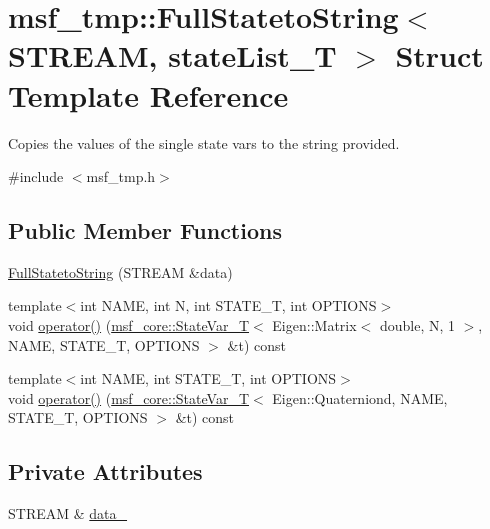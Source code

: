 \hypertarget{structmsf__tmp_1_1FullStatetoString}{\section{msf\-\_\-tmp\-:\-:Full\-Stateto\-String$<$ S\-T\-R\-E\-A\-M, state\-List\-\_\-\-T $>$ Struct Template Reference}
\label{structmsf__tmp_1_1FullStatetoString}
}


Copies the values of the single state vars to the string provided.  




{\ttfamily \#include $<$msf\-\_\-tmp.\-h$>$}

\subsection*{Public Member Functions}
\begin{DoxyCompactItemize}
\item 
\hyperlink{structmsf__tmp_1_1FullStatetoString_a01b581b8a93e7de256d487d609f9f1ca}{Full\-Stateto\-String} (S\-T\-R\-E\-A\-M \&data)
\item 
{\footnotesize template$<$int N\-A\-M\-E, int N, int S\-T\-A\-T\-E\-\_\-\-T, int O\-P\-T\-I\-O\-N\-S$>$ }\\void \hyperlink{structmsf__tmp_1_1FullStatetoString_a8ab4cd670bb8d0a94040ca09bad2a28d}{operator()} (\hyperlink{structmsf__core_1_1StateVar__T}{msf\-\_\-core\-::\-State\-Var\-\_\-\-T}$<$ Eigen\-::\-Matrix$<$ double, N, 1 $>$, N\-A\-M\-E, S\-T\-A\-T\-E\-\_\-\-T, O\-P\-T\-I\-O\-N\-S $>$ \&t) const 
\item 
{\footnotesize template$<$int N\-A\-M\-E, int S\-T\-A\-T\-E\-\_\-\-T, int O\-P\-T\-I\-O\-N\-S$>$ }\\void \hyperlink{structmsf__tmp_1_1FullStatetoString_af63628ec73c77813ebc5abfd30add10e}{operator()} (\hyperlink{structmsf__core_1_1StateVar__T}{msf\-\_\-core\-::\-State\-Var\-\_\-\-T}$<$ Eigen\-::\-Quaterniond, N\-A\-M\-E, S\-T\-A\-T\-E\-\_\-\-T, O\-P\-T\-I\-O\-N\-S $>$ \&t) const 
\end{DoxyCompactItemize}
\subsection*{Private Attributes}
\begin{DoxyCompactItemize}
\item 
S\-T\-R\-E\-A\-M \& \hyperlink{structmsf__tmp_1_1FullStatetoString_a31ee8e0c80209164fbabafb1b37666e8}{data\-\_\-}
\end{DoxyCompactItemize}


